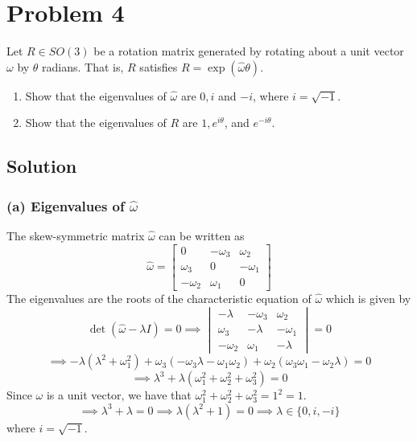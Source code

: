 \section*{Problem 4}

Let \(R \in S O(3)\) be a rotation matrix generated by rotating about a unit vector \(\omega \) by \(\theta \) radians.
That is, \(R\) satisfies \(R=\exp (\hat{\omega} \theta)\).
\begin{enumerate}[label= (\alph*)]
    \item Show that the eigenvalues of \(\hat{\omega}\) are \(0, i\) and \(-i\), where \(i=\sqrt{-1}\).
    \item Show that the eigenvalues of \(R\) are \(1, e^{i \theta}\), and \(e^{-i \theta}\).
\end{enumerate}

\subsection*{Solution}

\subsubsection*{(a) Eigenvalues of \(\hat{\omega}\)}

The skew-symmetric matrix \(\hat{\omega}\) can be written as
\[
    \hat{\omega} = \begin{bmatrix}
        0           & -\omega_{3} & \omega_{2}  \\
        \omega_{3}  & 0           & -\omega_{1} \\
        -\omega_{2} & \omega_{1}  & 0
    \end{bmatrix}
\]
The eigenvalues are the roots of the characteristic equation of \(\hat{\omega}\) which is given by
\[
    \det(\hat{\omega} - \lambda I) = 0
    \implies
    \begin{vmatrix}
        -\lambda    & -\omega_{3} & \omega_{2}  \\
        \omega_{3}  & -\lambda    & -\omega_{1} \\
        -\omega_{2} & \omega_{1}  & -\lambda
    \end{vmatrix}
    = 0
\]
\[
    \implies
    -\lambda (\lambda^{2} + \omega_{1}^{2}) + \omega_{3} (-\omega_{3} \lambda - \omega_{1} \omega_{2}) + \omega_{2} (\omega_{3} \omega_{1} - \omega_{2} \lambda) = 0
\]
\[
    \implies
    \lambda^{3} + \lambda (\omega_{1}^{2} + \omega_{2}^{2} + \omega_{3}^{2}) = 0
\]
Since \( \omega \) is a unit vector, we have that \( \omega_{1}^{2} + \omega_{2}^{2} + \omega_{3}^{2} = 1^2 = 1 \).
\[
    \implies
    \lambda^{3} + \lambda = 0
    \implies
    \lambda (\lambda^{2} + 1) = 0
    \implies
    \lambda \in \{ 0, i, -i \}
\]
where \( i = \sqrt{-1} \).

